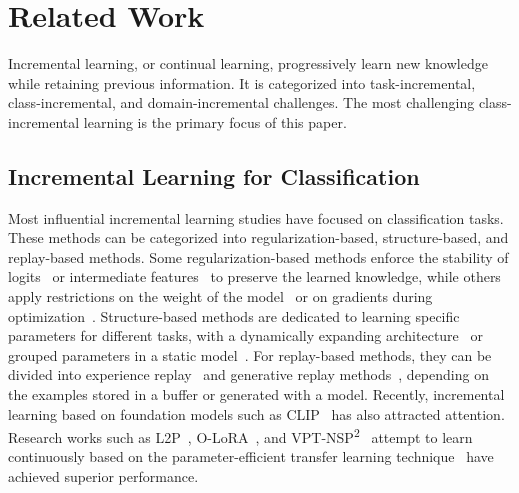 \section{Related Work}

Incremental learning, or continual learning, progressively learn new knowledge while retaining previous information. It is categorized into task-incremental, class-incremental, and domain-incremental challenges. The most challenging class-incremental learning is the primary focus of this paper.

\subsection{Incremental Learning for Classification}
Most influential incremental learning studies have focused on classification tasks. 
These methods can be categorized into regularization-based, structure-based, and replay-based methods. 
Some regularization-based methods enforce the stability of logits~\cite{lwf, slca} or intermediate features~\cite{geodl} to preserve the learned knowledge, while others apply restrictions on the weight of the model~\cite{ewc} or on gradients during optimization~\cite{gem, adamnscl}. 
Structure-based methods are dedicated to learning specific parameters for different tasks, with a dynamically expanding architecture~\cite{rusu2016progressive} or grouped parameters in a static model~\cite{pathnet}. 
For replay-based methods, they can be divided into experience replay~\cite{der, pass,yono} and generative replay methods~\cite{lifelonggan,kemker2017fearnet}, depending on the examples stored in a buffer or generated with a model. 
Recently, incremental learning based on foundation models such as CLIP~\cite{clip} has also attracted attention. 
Research works such as L2P~\cite{l2p}, O-LoRA~\cite{olora}, and VPT-NSP\textsuperscript{2}~\cite{lu2024visual} attempt to learn continuously based on the parameter-efficient transfer learning technique~\cite{coop, vpt, dpt} have achieved superior performance.

